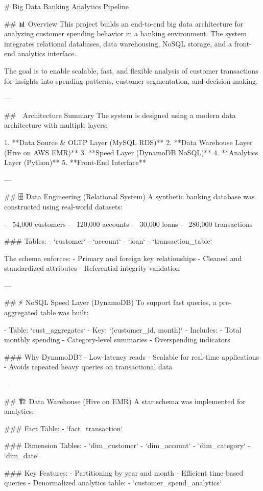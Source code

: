 # Big Data Banking Analytics Pipeline

## 📊 Overview
This project builds an end-to-end big data architecture for analyzing customer spending behavior in a banking environment. The system integrates relational databases, data warehousing, NoSQL storage, and a front-end analytics interface.

The goal is to enable scalable, fast, and flexible analysis of customer transactions for insights into spending patterns, customer segmentation, and decision-making.

---

## 🧠 Architecture Summary
The system is designed using a modern data architecture with multiple layers:

1. **Data Source & OLTP Layer (MySQL RDS)**
2. **Data Warehouse Layer (Hive on AWS EMR)**
3. **Speed Layer (DynamoDB NoSQL)**
4. **Analytics Layer (Python)**
5. **Front-End Interface**

---

## 🗄️ Data Engineering (Relational System)
A synthetic banking database was constructed using real-world datasets:

- ~54,000 customers
- ~120,000 accounts
- ~30,000 loans
- ~280,000 transactions

### Tables:
- `customer`
- `account`
- `loan`
- `transaction_table`

The schema enforces:
- Primary and foreign key relationships
- Cleaned and standardized attributes
- Referential integrity validation

---

## ⚡ NoSQL Speed Layer (DynamoDB)
To support fast queries, a pre-aggregated table was built:

- Table: `cust_aggregates`
- Key: `(customer_id, month)`
- Includes:
  - Total monthly spending
  - Category-level summaries
  - Overspending indicators

### Why DynamoDB?
- Low-latency reads
- Scalable for real-time applications
- Avoids repeated heavy queries on transactional data

---

## 🏗️ Data Warehouse (Hive on EMR)
A star schema was implemented for analytics:

### Fact Table:
- `fact_transaction`

### Dimension Tables:
- `dim_customer`
- `dim_account`
- `dim_category`
- `dim_date`

### Key Features:
- Partitioning by year and month
- Efficient time-based queries
- Denormalized analytics table:
  - `customer_spend_analytics`


